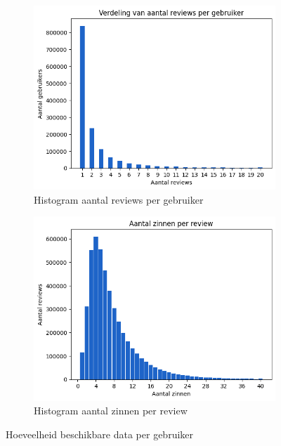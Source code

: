 \begin{figure}[H]
    \begin{subfigure}{.5\textwidth}
        \centering
        \includegraphics[width=1\linewidth]{fig/chapt3/verdeling_aantal_reviews_per_gebruiker.png}
        \caption{Histogram aantal reviews per gebruiker}
        \label{fig:chapt3_verdeling_aantal_reviews_per_gebruiker}
    \end{subfigure}
    \begin{subfigure}{.5\textwidth}
        \centering
        \includegraphics[width=1\linewidth]{fig/chapt3/zin_per_review.png}
        \caption{Histogram aantal zinnen per review}
        \label{fig:chapt3_verdeling_aantal_zinnen_per_review}
    \end{subfigure}
    \caption{Hoeveelheid beschikbare data per gebruiker}
\end{figure}

